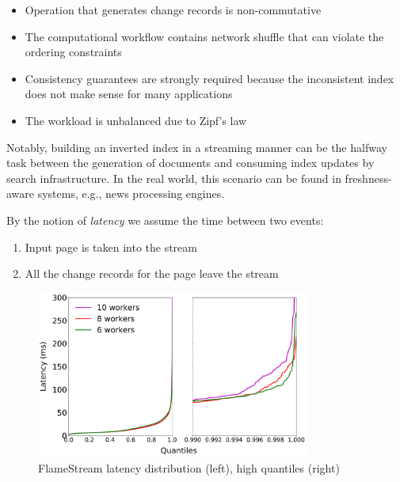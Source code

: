 \begin{itemize}
    \item Operation that generates change records is non-commutative
    \item The computational workflow    contains network shuffle that can violate the ordering constraints
    \item Consistency guarantees are strongly required because the inconsistent index does not make sense for many applications
    \item The workload is unbalanced due to Zipf's law
\end{itemize}

Notably, building an inverted index in a streaming manner can be the halfway task between the generation of documents and consuming index updates by search infrastructure. In the real world, this scenario can be found in freshness-aware systems, e.g., news processing engines.

By the notion of {\it latency} we assume the time between two events: 

\begin{enumerate}
    \item Input page is taken into the stream
    \item All the change records for the page leave the stream
\end{enumerate}

\begin{figure}[t]
  \centering
  \includegraphics[width=0.80\textwidth]{Chapters/DeterministicModelRuntime/pics/fs-index-quantiles}
  \caption{FlameStream latency distribution (left),  high quantiles (right)}
  \label {fs-scalability}
\end{figure}

